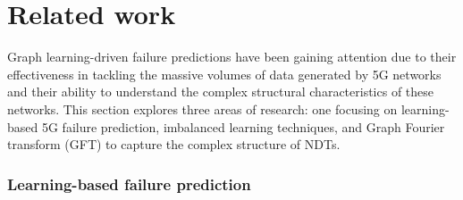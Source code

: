 \section{Related work}
Graph learning-driven failure predictions have been gaining attention due to their effectiveness in tackling the massive volumes of data generated by 5G networks and their ability to understand the complex structural characteristics of these networks. This section explores three areas of research: one focusing on learning-based 5G failure prediction, imbalanced learning techniques, and Graph Fourier transform (GFT) to capture the complex structure of NDTs.

\subsubsection{Learning-based failure prediction}

